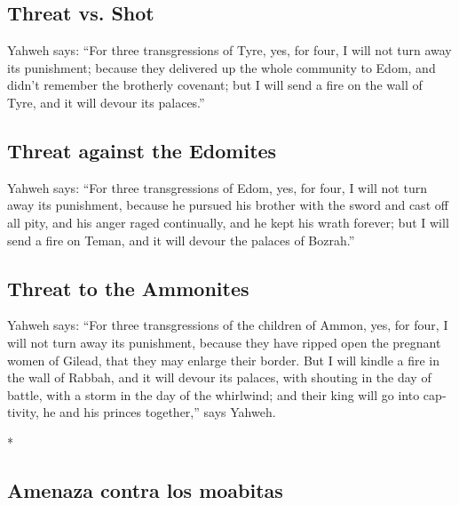 \begin{paracol}{2}
\begin{otherlanguage}{english}
\hypertarget{threat-vs.-shot}{%
\subsection{Threat vs. Shot}\label{threat-vs.-shot}}

 Yahweh says: ``For three transgressions of Tyre, yes, for
four, I will not turn away its punishment; because they delivered up the
whole community to Edom, and didn't remember the brotherly covenant;
 but I will send a fire on the wall of Tyre, and it will
devour its palaces.''

\hypertarget{threat-against-the-edomites}{%
\subsection{Threat against the
Edomites}\label{threat-against-the-edomites}}

 Yahweh says: ``For three transgressions of Edom, yes,
for four, I will not turn away its punishment, because he pursued his
brother with the sword and cast off all pity, and his anger raged
continually, and he kept his wrath forever;  but I will
send a fire on Teman, and it will devour the palaces of Bozrah.''

\hypertarget{threat-to-the-ammonites}{%
\subsection{Threat to the Ammonites}\label{threat-to-the-ammonites}}

 Yahweh says: ``For three transgressions of the children
of Ammon, yes, for four, I will not turn away its punishment, because
they have ripped open the pregnant women of Gilead, that they may
enlarge their border.  But I will kindle a fire in the
wall of Rabbah, and it will devour its palaces, with shouting in the day
of battle, with a storm in the day of the whirlwind;  and
their king will go into captivity, he and his princes together,'' says
Yahweh.

\end{otherlanguage}

\switchcolumn[0]*

\hypertarget{amenaza-contra-los-moabitas}{%
\subsection{Amenaza contra los
moabitas}\label{amenaza-contra-los-moabitas}}


\end{paracol}
